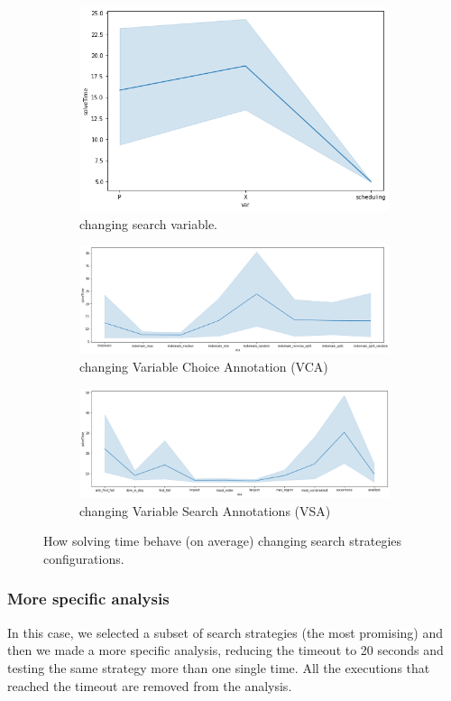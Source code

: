 \documentclass[10pt]{article}
\begin{document}
	\begin{figure}
		\centering

		\begin{subfigure}[c]{\textwidth}
			\centering
			\includegraphics[width=.5\textwidth]{var.png}
			\caption{changing search variable.}
		\end{subfigure}
		\begin{subfigure}[b]{\textwidth}
			\includegraphics[width=\textwidth]{vca.png}
			\caption{changing Variable Choice Annotation (VCA)}
		\end{subfigure}
		\begin{subfigure}[b]{\textwidth}
			\includegraphics[width=\textwidth]{vsa.png}
			\caption{changing Variable Search Annotations (VSA)}
		\end{subfigure}
		
		\caption{How solving time behave (on average) changing search strategies configurations.}
        \label{fig:search-strategies-gen}
	\end{figure}


	\subsubsection{More specific analysis}
	\label{subsubsec:more-specific-analysis}
	In this case, we selected a subset of search strategies (the most promising)
	and then we made a more specific analysis, reducing the timeout to 20 seconds 
	and testing the same strategy more than one single time. All the executions
	that reached the timeout are removed from the analysis.
\end{document}
